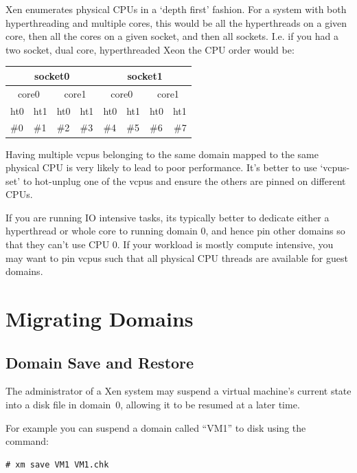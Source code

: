 \documentclass[11pt,twoside,final,openright]{report}
\begin{document}
Xen enumerates physical CPUs in a `depth first' fashion.  For a system
with both hyperthreading and multiple cores, this would be all the
hyperthreads on a given core, then all the cores on a given socket,
and then all sockets.  I.e.  if you had a two socket, dual core,
hyperthreaded Xeon the CPU order would be:


\begin{center}
\begin{tabular}{l|l|l|l|l|l|l|r}
\multicolumn{4}{c|}{socket0}     &  \multicolumn{4}{c}{socket1} \\ \hline
\multicolumn{2}{c|}{core0}  &  \multicolumn{2}{c|}{core1}  &
\multicolumn{2}{c|}{core0}  &  \multicolumn{2}{c}{core1} \\ \hline
ht0 & ht1 & ht0 & ht1 & ht0 & ht1 & ht0 & ht1 \\
\#0 & \#1 & \#2 & \#3 & \#4 & \#5 & \#6 & \#7 \\
\end{tabular}
\end{center}


Having multiple vcpus belonging to the same domain mapped to the same
physical CPU is very likely to lead to poor performance. It's better to
use `vcpus-set' to hot-unplug one of the vcpus and ensure the others are
pinned on different CPUs.

If you are running IO intensive tasks, its typically better to dedicate
either a hyperthread or whole core to running domain 0, and hence pin
other domains so that they can't use CPU 0. If your workload is mostly
compute intensive, you may want to pin vcpus such that all physical CPU
threads are available for guest domains.

\chapter{Migrating Domains}

\section{Domain Save and Restore}

The administrator of a Xen system may suspend a virtual machine's
current state into a disk file in domain~0, allowing it to be resumed at
a later time.

For example you can suspend a domain called ``VM1'' to disk using the
command:
\begin{verbatim}
# xm save VM1 VM1.chk
\end{verbatim}
\end{document}
